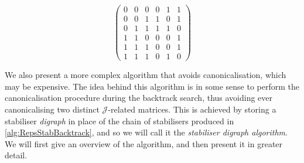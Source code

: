 \documentclass[11pt]{article}
\numberwithin{equation}{section}
\newcommand{\J}{\mathscr{J}}
\begin{document}
\[ 
  \begin{pmatrix}
    0 & 0 & 0 & 0 & 1 & 1 \\
    0 & 0 & 1 & 1 & 0 & 1 \\
    0 & 1 & 1 & 1 & 1 & 0 \\
    1 & 1 & 0 & 0 & 0 & 1 \\
    1 & 1 & 1 & 0 & 0 & 1 \\
    1 & 1 & 1 & 0 & 1 & 0
  \end{pmatrix}
\]

We also present a more complex algorithm that avoids canonicalisation, which may
be expensive. The idea behind this algorithm is in some sense to perform the
canonicalisation procedure during the backtrack search, thus avoiding ever
canonicalising two distinct $\J$-related matrices. This is achieved by storing a
stabiliser \emph{digraph} in place of the chain of stabilisers produced in
\ref{alg:RepsStabBacktrack}, and so we will call it the \emph{stabiliser digraph
algorithm}. We will first give an overview of the algorithm, and then
present it in greater detail.\\
\end{document}
